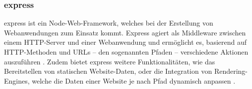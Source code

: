 \subsubsection{express}
\glqq{}express\grqq{} ist ein Node-Web-Framework, welches bei der Erstellung von Webanwendungen zum Einsatz kommt. Express agiert als Middleware zwischen einem \acs{HTTP}-Server und einer Webanwendung und ermöglicht es, basierend auf \acs{HTTP}-Methoden und \acf{URL}s -- den sogenannten \glqq{}Pfaden\grqq{} -- verschiedene Aktionen auszuführen \cite{express}. Zudem bietet express weitere Funktionalitäten, wie das Bereitstellen von statischen Website-Daten, oder die Integration von \glqq{}Rendering-Engines\grqq{}, welche die Daten einer Website je nach Pfad dynamisch anpassen \cite{express}.